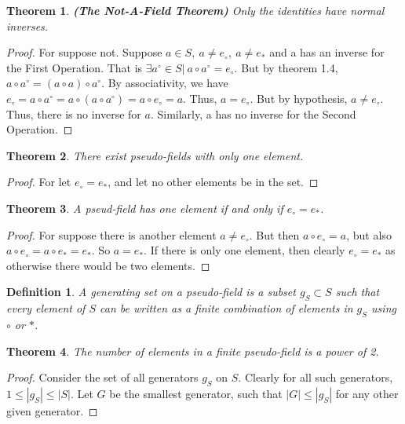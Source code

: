 \documentclass[crop=false,class=book]{standalone}
\theoremstyle{mystyle}
\newtheorem{theorem}{Theorem}[section]
\newtheorem{definition}{Definition}[section]
\begin{document}
\begin{theorem} \textbf{(The Not-A-Field Theorem)} Only the identities have normal inverses.
\end{theorem}
\begin{proof} For suppose not. Suppose $a\in S,\ a\ne e_{\circ},\ a\ne e_{*}$ and a has an inverse for the First Operation. That is $\exists a^{\circ}\in S|\ a\circ a^{\circ}=e_{\circ}$. But by theorem 1.4, $a\circ a^{\circ}=(a\circ a)\circ a^{\circ}$. By associativity, we have $e_{\circ}=a\circ a^{\circ} = a\circ (a\circ a^{\circ})=a\circ e_{\circ}=a$. Thus, $a=e_{\circ}$. But by hypothesis, $a\ne e_{\circ}$. Thus, there is no inverse for $a$. Similarly, a has no inverse for the Second Operation.
\end{proof}
\begin{theorem}
There exist pseudo-fields with only one element.
\end{theorem}
\begin{proof}
For let $e_{\circ} = e_{*}$, and let no other elements be in the set. 
\end{proof}
\begin{theorem}
A pseud-field has one element if and only if $e_{\circ} = e_{*}$.
\end{theorem}
\begin{proof}
For suppose there is another element $a \ne e_{\circ}$. But then $a \circ e_{\circ} = a$, but also $a \circ e_{\circ} = a \circ e_{*} = e_{*}$. So $a = e_{*}$. If there is only one element, then clearly $e_{\circ} = e_{*}$ as otherwise there would be two elements.
\end{proof}
\begin{definition} A generating set on a pseudo-field is a subset $g_S \subset S$ such that every element of $S$ can be written as a finite combination of elements in $g_S$ using $\circ$ or $*$.
\end{definition}
\begin{theorem}
The number of elements in a finite pseudo-field is a power of 2.
\end{theorem}
\begin{proof}
Consider the set of all generators $g_S$ on $S$. Clearly for all such generators, $1\leq |g_S|\leq |S|$. Let $G$ be the smallest generator, such that $|G| \leq |g_S|$ for any other given generator. 
\end{proof}
\end{document}
